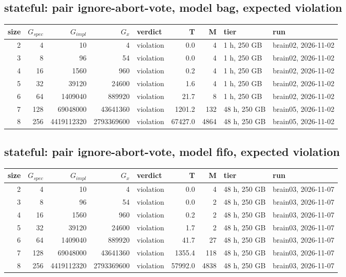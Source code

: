 \documentclass[10pt]{article}
\begin{document}
\subsection*{stateful: pair \textsf{ignore-abort-vote}, model bag, expected violation}
\begin{longtable}{@{}rrrrlrrll@{}}
\toprule
size & $G_{\mathit{spec}}$ & $G_{\mathit{impl}}$ & $G_x$ & verdict & T & M & tier & run \\
\midrule
\endhead
\color{blue} 2 & 4 & 10 & 4 & violation & 0.0 & 4 & 1 h, 250 GB & brain02, 2026-11-02 \\
\color{blue} 3 & 8 & 96 & 54 & violation & 0.0 & 4 & 1 h, 250 GB & brain02, 2026-11-02 \\
\color{blue} 4 & 16 & 1560 & 960 & violation & 0.2 & 4 & 1 h, 250 GB & brain02, 2026-11-02 \\
\color{blue} 5 & 32 & 39120 & 24600 & violation & 1.6 & 4 & 1 h, 250 GB & brain02, 2026-11-02 \\
\color{blue} 6 & 64 & 1409040 & 889920 & violation & 21.7 & 8 & 1 h, 250 GB & brain02, 2026-11-02 \\
\color{blue} 7 & 128 & 69048000 & 43641360 & violation & 1201.2 & 132 & 48 h, 250 GB & brain05, 2026-11-02 \\
\color{blue} 8 & 256 & 4419112320 & 2793369600 & violation & 67427.0 & 4864 & 48 h, 250 GB & brain05, 2026-11-02 \\
\bottomrule
\end{longtable}
\subsection*{stateful: pair \textsf{ignore-abort-vote}, model fifo, expected violation}
\begin{longtable}{@{}rrrrlrrll@{}}
\toprule
size & $G_{\mathit{spec}}$ & $G_{\mathit{impl}}$ & $G_x$ & verdict & T & M & tier & run \\
\midrule
\endhead
\color{blue} 2 & 4 & 10 & 4 & violation & 0.0 & 4 & 48 h, 250 GB & brain03, 2026-11-07 \\
\color{blue} 3 & 8 & 96 & 54 & violation & 0.0 & 2 & 48 h, 250 GB & brain03, 2026-11-07 \\
\color{blue} 4 & 16 & 1560 & 960 & violation & 0.2 & 2 & 48 h, 250 GB & brain03, 2026-11-07 \\
\color{blue} 5 & 32 & 39120 & 24600 & violation & 1.7 & 2 & 48 h, 250 GB & brain03, 2026-11-07 \\
\color{blue} 6 & 64 & 1409040 & 889920 & violation & 41.7 & 27 & 48 h, 250 GB & brain03, 2026-11-07 \\
\color{blue} 7 & 128 & 69048000 & 43641360 & violation & 1355.4 & 118 & 48 h, 250 GB & brain03, 2026-11-07 \\
\color{blue} 8 & 256 & 4419112320 & 2793369600 & violation & 57992.0 & 4838 & 48 h, 250 GB & brain03, 2026-11-07 \\
\bottomrule
\end{longtable}
\end{document}
